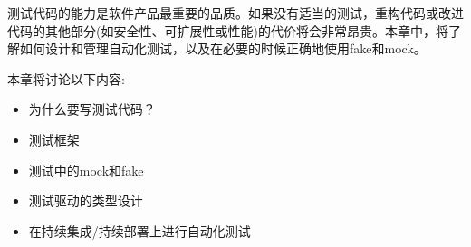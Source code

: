 
测试代码的能力是软件产品最重要的品质。如果没有适当的测试，重构代码或改进代码的其他部分(如安全性、可扩展性或性能)的代价将会非常昂贵。本章中，将了解如何设计和管理自动化测试，以及在必要的时候正确地使用fake和mock。

本章将讨论以下内容:

\begin{itemize}
\item 
为什么要写测试代码？

\item 
测试框架

\item 
测试中的mock和fake

\item 
测试驱动的类型设计

\item 
在持续集成/持续部署上进行自动化测试
\end{itemize}
